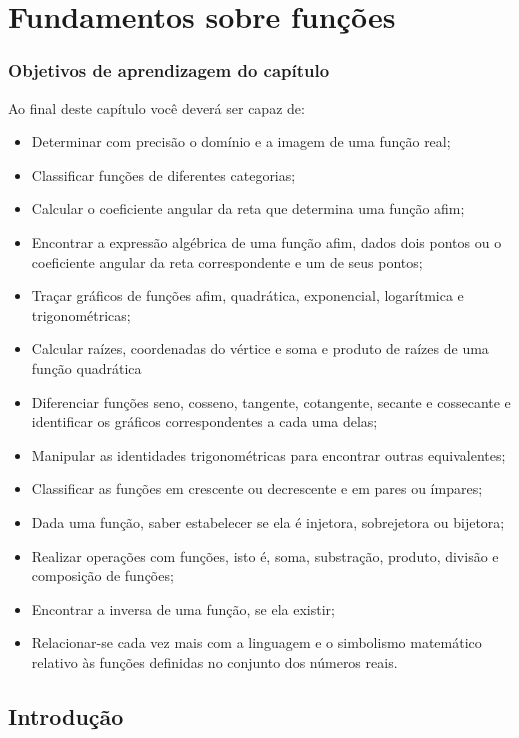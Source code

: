 \documentclass[../main.tex]{subfiles}
\begin{document}
\chapter{Fundamentos sobre funções}\label{cap_funcao}
\minitoc
\subsection*{Objetivos de aprendizagem do capítulo}
Ao final deste capítulo você deverá ser capaz de:
\begin{itemize}
    \item Determinar com precisão o domínio e a imagem de uma função real;
    \item Classificar funções de diferentes categorias;
    \item Calcular o coeficiente angular da reta que determina uma função afim;
    \item Encontrar a expressão algébrica de uma função afim, dados dois pontos ou o coeficiente angular da reta correspondente e um de seus pontos;
    \item Traçar gráficos de funções afim, quadrática, exponencial, logarítmica e trigonométricas;
    \item Calcular raízes, coordenadas do vértice e soma e produto de raízes de uma função quadrática
    \item Diferenciar funções seno, cosseno, tangente, cotangente, secante e cossecante e identificar os gráficos correspondentes a cada uma delas;
    \item Manipular as identidades trigonométricas para encontrar outras equivalentes;
    \item Classificar as funções em crescente ou decrescente e em pares ou ímpares;
    \item Dada uma função, saber estabelecer se ela é injetora, sobrejetora ou bijetora;
    \item Realizar operações com funções, isto é, soma, substração, produto, divisão e composição de funções;
    \item Encontrar a inversa de uma função, se ela existir;
    \item Relacionar-se cada vez mais com a linguagem e o simbolismo matemático relativo às funções definidas no conjunto dos números reais.
\end{itemize}
\section{Introdução}
\end{document}
